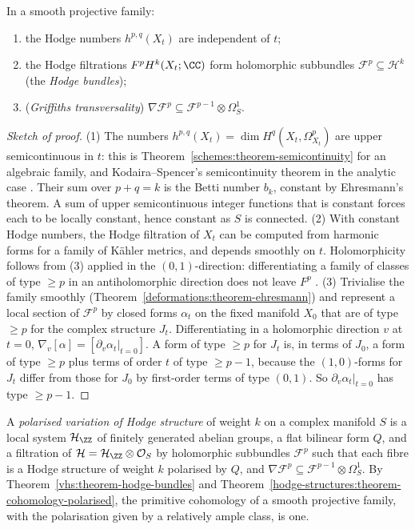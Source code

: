 \begin{theorem}\label{vhs:theorem-hodge-bundles}
In a smooth projective family:
\begin{enumerate}
\item the Hodge numbers $h^{p,q}(X_t)$ are independent of $t$;
\item the Hodge filtrations $F^pH^k(X_t; \CC)$ form holomorphic subbundles $\mathcal{F}^p \subseteq \mathcal{H}^k$ (the \emph{Hodge bundles});
\item (\emph{Griffiths transversality}) $\nabla\mathcal{F}^p \subseteq \mathcal{F}^{p-1} \otimes \Omega^1_S$.
\end{enumerate}
\end{theorem}

\begin{proof}[Sketch of proof]
(1) The numbers $h^{p,q}(X_t) = \dim H^q(X_t, \Omega^p_{X_t})$ are upper semicontinuous in $t$: this is Theorem~\ref{schemes:theorem-semicontinuity} for an algebraic family, and
Kodaira--Spencer's semicontinuity theorem in the analytic case \cite[Chapter 9]{voisin-hodge-1}. Their sum over $p + q = k$ is the Betti number $b_k$, constant by Ehresmann's theorem. A sum of
upper semicontinuous integer functions that is constant forces each to be locally constant, hence constant as $S$ is connected. (2) With constant Hodge numbers, the Hodge
filtration of $X_t$ can be computed from harmonic forms for a family of K\"ahler metrics, and depends smoothly on $t$. Holomorphicity follows from (3) applied in the $(0,1)$-direction:
differentiating a family of classes of type $\geq p$ in an antiholomorphic direction does not leave $F^p$ \cite[Chapter 10]{voisin-hodge-1}. (3) Trivialise the family smoothly
(Theorem~\ref{deformations:theorem-ehresmann}) and represent a local section of $\mathcal{F}^p$ by closed forms $\alpha_t$ on the fixed manifold $X_0$ that are of type $\geq p$ for the complex structure
$J_t$. Differentiating in a holomorphic direction $v$ at $t = 0$, $\nabla_v[\alpha] = [\partial_v\alpha_t|_{t=0}]$. A form of type $\geq p$ for $J_t$ is, in terms of $J_0$, a form of type $\geq p$ plus terms
of order $t$ of type $\geq p - 1$, because the $(1,0)$-forms for $J_t$ differ from those for $J_0$ by first-order terms of type $(0,1)$. So $\partial_v\alpha_t|_{t=0}$ has type $\geq p - 1$.
\end{proof}

\begin{definition}\label{vhs:definition-vhs}
A \emph{polarised variation of Hodge structure} of weight $k$ on a complex manifold $S$ is a local system $\mathcal{H}_\ZZ$ of finitely generated abelian groups, a flat bilinear form $Q$, and a
filtration of $\mathcal{H} = \mathcal{H}_\ZZ \otimes \mathcal{O}_S$ by holomorphic subbundles $\mathcal{F}^p$ such that each fibre is a Hodge structure of weight $k$ polarised by $Q$, and
$\nabla\mathcal{F}^p \subseteq \mathcal{F}^{p-1} \otimes \Omega^1_S$. By Theorem~\ref{vhs:theorem-hodge-bundles} and Theorem~\ref{hodge-structures:theorem-cohomology-polarised}, the primitive
cohomology of a smooth projective family, with the polarisation given by a relatively ample class, is one.
\end{definition}

